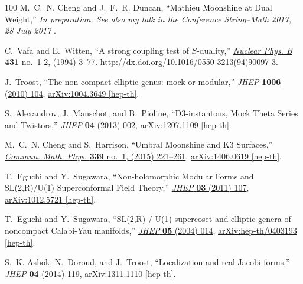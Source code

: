 \documentclass[11pt,a4paper,fontset=windows]{ctexart}
\numberwithin{equation}{section}
\begin{document}
\begin{thebibliography}{100}
M.~C.~N. Cheng and J.~F.~R. Duncan, ``{Mathieu Moonshine at Dual Weight},''
  {\em In preparation. See also my talk in the Conference String--Math 2017, 28
  July 2017} .

C.~Vafa and E.~Witten, ``A strong coupling test of {$S$}-duality,''
  \href{http://dx.doi.org/10.1016/0550-3213(94)90097-3}{{\em Nuclear Phys. B}
  {\bfseries 431} no.~1-2, (1994) 3--77}.
  \url{http://dx.doi.org/10.1016/0550-3213(94)90097-3}.

J.~Troost, ``{The non-compact elliptic genus: mock or modular},''
  \href{http://dx.doi.org/10.1007/JHEP06(2010)104}{{\em JHEP} {\bfseries 1006}
  (2010) 104},
\href{http://arxiv.org/abs/1004.3649}{{\ttfamily arXiv:1004.3649 [hep-th]}}.

S.~Alexandrov, J.~Manschot, and B.~Pioline, ``{D3-instantons, Mock Theta Series
  and Twistors},'' \href{http://dx.doi.org/10.1007/JHEP04(2013)002}{{\em JHEP}
  {\bfseries 04} (2013) 002},
\href{http://arxiv.org/abs/1207.1109}{{\ttfamily arXiv:1207.1109 [hep-th]}}.

M.~C.~N. Cheng and S.~Harrison, ``{Umbral Moonshine and K3 Surfaces},''
  \href{http://dx.doi.org/10.1007/s00220-015-2398-5}{{\em Commun. Math. Phys.}
  {\bfseries 339} no.~1, (2015) 221--261},
\href{http://arxiv.org/abs/1406.0619}{{\ttfamily arXiv:1406.0619 [hep-th]}}.

T.~Eguchi and Y.~Sugawara, ``{Non-holomorphic Modular Forms and SL(2,R)/U(1)
  Superconformal Field Theory},''
  \href{http://dx.doi.org/10.1007/JHEP03(2011)107}{{\em JHEP} {\bfseries 03}
  (2011) 107},
\href{http://arxiv.org/abs/1012.5721}{{\ttfamily arXiv:1012.5721 [hep-th]}}.

T.~Eguchi and Y.~Sugawara, ``{SL(2,R) / U(1) supercoset and elliptic genera of
  noncompact Calabi-Yau manifolds},''
  \href{http://dx.doi.org/10.1088/1126-6708/2004/05/014}{{\em JHEP} {\bfseries
  05} (2004) 014},
\href{http://arxiv.org/abs/hep-th/0403193}{{\ttfamily arXiv:hep-th/0403193
  [hep-th]}}.

S.~K. Ashok, N.~Doroud, and J.~Troost, ``{Localization and real Jacobi
  forms},'' \href{http://dx.doi.org/10.1007/JHEP04(2014)119}{{\em JHEP}
  {\bfseries 04} (2014) 119},
\href{http://arxiv.org/abs/1311.1110}{{\ttfamily arXiv:1311.1110 [hep-th]}}.


\end{thebibliography}
\end{document}
